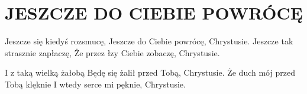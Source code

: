 \documentclass[../../../songbook.tex]{subfiles}
\begin{document}
\TabPositions{8cm} %
\section*{JESZCZE DO CIEBIE POWRÓCĘ}
{}
\vspace{0.5cm}
Jeszcze się kiedyś rozsmucę,					 \newline
Jeszcze do Ciebie powrócę, Chrystusie.			 \newline
Jeszcze tak strasznie zapłaczę,					 \newline
Że przez łzy Ciebie zobaczę, Chrystusie.		 \newline

\-\hspace{1cm} I z taką wielką żałobą			\newline
\-\hspace{1cm} Będę się żalił przed Tobą, Chrystusie.	\newline
\-\hspace{1cm} Że duch mój przed Tobą klęknie			\newline
\-\hspace{1cm} I wtedy serce mi pęknie, Chrystusie.	\newline
\end{document}

